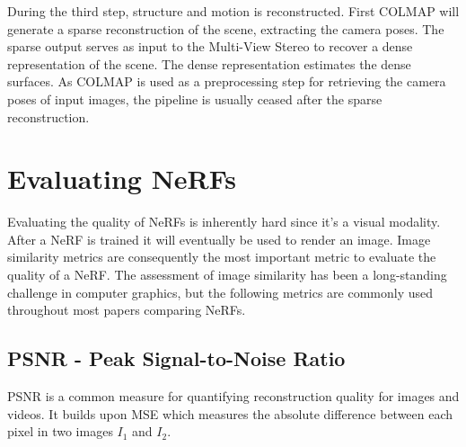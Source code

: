 During the third step, structure and motion is reconstructed. First COLMAP will generate a sparse reconstruction of the scene, extracting the camera poses. The sparse output serves as input to the Multi-View Stereo to recover a dense representation of the scene. The dense representation estimates the dense surfaces. As COLMAP is used as a preprocessing step for retrieving the camera poses of input images, the pipeline is usually ceased after the sparse reconstruction.



\begin{comment}
Exhaustive matching:
time complexity: O(n^2), where n is the number of images
memory complexity: O(n) for storing all images, O(n^2) for storing the results of the matching process

Sequential matching:
time complexity: O(n * k), where n is the number of images and k is the number of adjacent images each image is matched against
memory complexity: O(n * k)

Vocabulary tree-based matching:
time complexity: O(n^2), assuming that the size of the vocabulary tree is constant and not a function of the number n of images
memory complexity: O(n * k), where k is the number of top-retrieved images that each image is matched against
There is definitively literature on the topic of the time and memory complexity of vocabulary tree-based matching and image retrieval
\end{comment}




\section{Evaluating NeRFs} \label{sec:evaluating-nerfs}
Evaluating the quality of NeRFs is inherently hard since it's a visual modality. After a NeRF is trained it will eventually be used to render an image. Image similarity metrics are consequently the most important metric to evaluate the quality of a NeRF. The assessment of image similarity has been a long-standing challenge in computer graphics, but the following metrics are commonly used throughout most papers comparing NeRFs.

\subsection{PSNR - Peak Signal-to-Noise Ratio}
PSNR is a common measure for quantifying reconstruction quality for images and videos. It builds upon MSE which measures the absolute difference between each pixel in two images $I_1$ and $I_2$.

